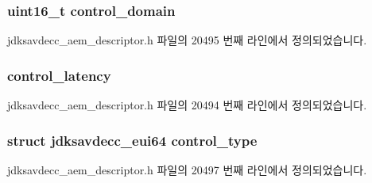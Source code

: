 \subsubsection[{\texorpdfstring{control\+\_\+domain}{control_domain}}]{\setlength{\rightskip}{0pt plus 5cm}uint16\+\_\+t control\+\_\+domain}\hypertarget{structjdksavdecc__descriptor__matrix_a8937b22996b7c28ae209f29fe777f03a}{}\label{structjdksavdecc__descriptor__matrix_a8937b22996b7c28ae209f29fe777f03a}


jdksavdecc\+\_\+aem\+\_\+descriptor.\+h 파일의 20495 번째 라인에서 정의되었습니다.

\subsubsection[{\texorpdfstring{control\+\_\+latency}{control_latency}}]{ control\+\_\+latency}\hypertarget{structjdksavdecc__descriptor__matrix_ab2bd4639caaf9a8078b68368afbd63b6}{}\label{structjdksavdecc__descriptor__matrix_ab2bd4639caaf9a8078b68368afbd63b6}


jdksavdecc\+\_\+aem\+\_\+descriptor.\+h 파일의 20494 번째 라인에서 정의되었습니다.

\subsubsection[{\texorpdfstring{control\+\_\+type}{control_type}}]{\setlength{\rightskip}{0pt plus 5cm}struct {\bf jdksavdecc\+\_\+eui64} control\+\_\+type}\hypertarget{structjdksavdecc__descriptor__matrix_affec595f0ec2a4ae7a3cece71d05adcb}{}\label{structjdksavdecc__descriptor__matrix_affec595f0ec2a4ae7a3cece71d05adcb}


jdksavdecc\+\_\+aem\+\_\+descriptor.\+h 파일의 20497 번째 라인에서 정의되었습니다.

